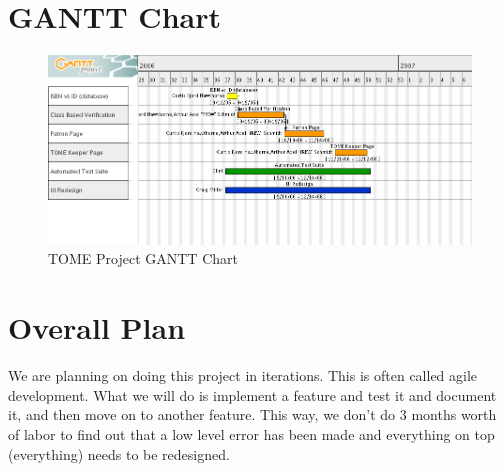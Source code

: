 \documentclass[12pt,titlepage]{article}
\begin{document}
\section{GANTT Chart}
\begin{figure}[h]
	\includegraphics[width=\textwidth]{GanttChart}
	\caption{TOME Project GANTT Chart}
\end{figure}
\section{Overall Plan}
We are planning on doing this project in iterations.  This is often called agile development.  What we will do is implement a feature and test it and document it, and then move on to another feature.  This way, we don't do 3 months worth of labor to find out that a low level error has been made and everything on top (everything) needs to be redesigned.
\end{document}
